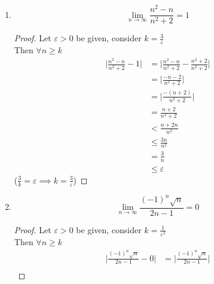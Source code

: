 \documentclass[12pt]{article}
\begin{document}
\begin{enumerate}
\begin{enumerate}
\begin{proof}
\begin{align*}
				                                               & \leq \varepsilon
			            \end{align*}
			            ($\frac{2}{k} = \varepsilon \implies \frac{2}{\varepsilon} = k $)
		            \end{proof}
		      \item \[\lim_{n \to \infty} \frac{n^2-n}{n^2+2} = 1\]
		            \begin{proof}
			            Let $\varepsilon > 0$ be given, consider $k = \frac{3}{\varepsilon} $ \\
			            Then $\forall n \geq k$
			            \begin{align*}
				            \bigg|\frac{n^2-n}{n^2+2} - 1\bigg| & = \bigg|\frac{n^2-n}{n^2+2} - \frac{n^2+2}{n^2+2}\bigg| \\
				                                                & = \bigg|\frac{-n-2}{n^2+2}\bigg|                        \\
				                                                & = \bigg|\frac{-(n+2)}{n^2+2}\bigg|                      \\
				                                                & = \frac{n+2}{n^2+2}                                     \\
				                                                & < \frac{n+2n}{n^2}                                      \\
				                                                & \leq \frac{3n}{n^2}                                     \\
				                                                & = \frac{3}{n}                                           \\
				                                                & \leq \varepsilon
			            \end{align*}
			            ($\frac{3}{k} = \varepsilon \implies k = \frac{3}{\varepsilon}$)
		            \end{proof}
		      \item \[\lim_{n \to \infty} \frac{(-1)^n\sqrt{n}}{2n-1} = 0\]
		            \begin{proof}
			            Let $\varepsilon > 0$ be given, consider $k = \frac{1}{\varepsilon^2}$ \\
			            Then $\forall n \geq k$
			            \begin{align*}
				            \bigg|\frac{(-1)^n\sqrt{n}}{2n-1} - 0\bigg| & = \bigg|\frac{(-1)^n\sqrt{n}}{2n-1} \bigg| \\

\end{align*}
\end{proof}
\end{enumerate}
\end{enumerate}
\end{document}
